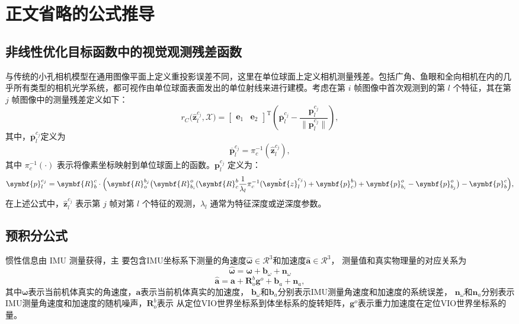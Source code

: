 
\chapter{正文省略的公式推导}

\section{非线性优化目标函数中的视觉观测残差函数}
\label{appendix:nonlinear_optimization}

与传统的小孔相机模型在通用图像平面上定义重投影误差不同，这里在单位球面上定义相机测量残差。包括广角、鱼眼和全向相机在内的几乎所有类型的相机光学系统，都可视作由单位球面表面发出的单位射线来进行建模。考虑在第 $i$ 帧图像中首次观测到的第 $l$ 个特征，其在第 $j$ 帧图像中的测量残差定义如下：
\begin{equation}
r_{C}\bigl(\hat{\symbf{z}}_l^{c_j}, \mathcal{X}\bigr) 
= 
\begin{bmatrix}
\symbf{e}_1 & \symbf{e}_2
\end{bmatrix}^\mathrm{T}
\left(
  \overline{\symbf{p}}_l^{c_j} - \frac{\symbf{p}_l^{c_j}}{\bigl\|\symbf{p}_l^{c_j}\bigr\|}
\right),
\end{equation}
其中，$\overline{\symbf{p}}_l^{c_j}$定义为
\begin{equation}
\overline{\symbf{p}}_l^{c_j} = \pi_c^{-1}(\hat{\symbf{z}}_l^{c_j}),
\end{equation}
其中 $\pi_c^{-1}(\cdot)$ 表示将像素坐标映射到单位球面上的函数。$\symbf{p}_l^{c_j}$ 定义为：
\begin{equation}
\symbf{p}_l^{c_j} = \symbf{R}_b^c \cdot
\Bigl( 
  \symbf{R}_{o}^{b_j}
  \bigl( 
    \symbf{R}_{b_i}^{o}
    (
      \symbf{R}_c^{b} \frac{1}{\lambda_l}\pi_c^{-1}(\hat{\symbf{z}}_l^{c_j}) + \symbf{p}_c^b
    ) + \symbf{p}_{b_i}^{o} - \symbf{p}^{o}_{b_j}
  \bigr) - \symbf{p}_{b}^{c}
\Bigr),
\end{equation}
在上述公式中，$\hat{\symbf{z}}_l^{c_j}$ 表示第 $j$ 帧对第 $l$ 个特征的观测，$\lambda_l$ 通常为特征深度或逆深度参数。


\section{预积分公式}
\label{appendix:preintegration}
惯性信息由 IMU 测量获得，主
要包含IMU坐标系下测量的角速度$\hat{\symbf{\omega}}\in\mathcal{R}^3$和加速度$\hat{\symbf{a}}\in\mathcal{R}^3$，
测量值和真实物理量的对应关系为
\begin{equation}
    \hat{\symbf{\omega}} = \symbf{\omega} + \symbf{b}_{\omega} + \symbf{n}_{\omega}
\end{equation}
\begin{equation}
  \hat{\symbf{a}} = \symbf{a} + \symbf{R}_o^b \symbf{g}^o + \symbf{b}_a + \symbf{n}_{a},
\end{equation}
其中$\symbf{\omega}$表示当前机体真实的角速度，$\symbf{a}$表示当前机体真实的加速度，
$\symbf{b}_{\omega}$和$\symbf{b}_a$分别表示IMU测量角速度和加速度的系统误差，
$\symbf{n}_{\omega}$和$\symbf{n}_{a}$分别表示IMU测量角速度和加速度的随机噪声，$\symbf{R}_o^b$表示
从定位VIO世界坐标系到体坐标系的旋转矩阵，$\symbf{g}^o$表示重力加速度在定位VIO世界坐标系的量。

